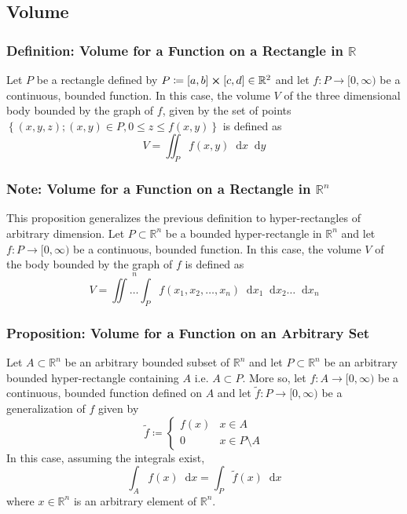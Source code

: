\documentclass[11pt, a4paper]{article}
\newcommand{\diff}{\mathop{}\!\mathrm{d}} %
\newcommand{\R}{\mathbb{R}} %
\begin{document}
\subsection{Volume}

\subsubsection{Definition: Volume for a Function on a Rectangle in $ \R $}
Let $ P $ be a rectangle defined by $P \coloneqq [a, b] \cross [c, d] \in \mathbb{R}^2 $ and let $ f : P \rightarrow [0, \infty)$ be a continuous, bounded function. In this case, the volume $ V $ of the three dimensional body bounded by the graph of $ f $, given by the set of points $ \left\{ (x, y, z); (x, y) \in P, 0\leq z \leq f(x, y) \right\} $ is defined as
\begin{equation*}
	V = \iint_P f(x, y) \diff x \diff y
\end{equation*}

\subsubsection{Note: Volume for a Function on a Rectangle in $ \R^n $}
This proposition generalizes the previous definition to hyper-rectangles of arbitrary dimension. Let $ P \subset \R^n $ be a bounded hyper-rectangle in $ \R^n $ and let $ f : P \rightarrow [0, \infty)$ be a continuous, bounded function. In this case, the volume $ V $ of the body bounded by the graph of $ f $ is defined as
\begin{equation*}
	V = \stackrel{n}{\iint \dots \int_{P}} f(x_1, x_2, \dots, x_n) \diff x_1 \diff x_2 \dots \diff x_n
\end{equation*}

\subsubsection{Proposition: Volume for a Function on an Arbitrary Set}
Let $ A \subset \mathbb{R}^n $ be an arbitrary bounded subset of $ \mathbb{R}^n $ and let $ P \subset \mathbb{R}^n $ be an arbitrary bounded hyper-rectangle containing $ A $ i.e. $ A \subset P $. More so, let $ f : A\rightarrow [0, \infty)$ be a continuous, bounded function defined on $ A $ and let $ \tilde{f}: P \rightarrow [0, \infty) $ be a generalization of $ f $ given by
\[ \tilde{f} \coloneqq 
\begin{cases} 
	f(x) & x \in A \\
	0 & x \in P \setminus A 
\end{cases}
\]
In this case, assuming the integrals exist,
\begin{equation*}
	\int_A f(x) \diff x = \int_P \tilde{f}(x) \diff x
\end{equation*}
where $ x \in \mathbb{R}^n $ is an arbitrary element of $ \mathbb{R}^n $.
\end{document}
